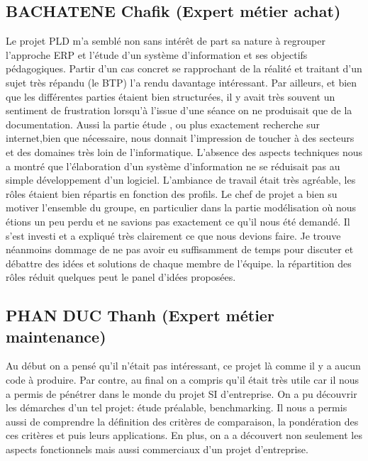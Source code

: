        \subsection{BACHATENE Chafik (Expert métier achat)}

Le projet PLD m'a semblé non sans intérêt de part sa nature à regrouper l'approche ERP et l'étude d'un système d'information et ses objectifs pédagogiques.
Partir d'un cas concret se rapprochant de la réalité et traitant d'un sujet très répandu (le BTP) l'a rendu davantage intéressant. Par ailleurs, et bien que
les différentes parties étaient bien structurées, il y avait très souvent un sentiment de frustration lorsqu'à l'issue d'une séance on ne produisait que de la documentation. Aussi la partie étude , ou plus exactement recherche sur internet,bien que nécessaire, nous donnait l'impression de toucher à des secteurs et des domaines très loin de l'informatique. 
L'absence des aspects techniques nous a montré que l'élaboration d'un système d'information ne se réduisait pas au simple développement d'un logiciel. 
L'ambiance de travail était très agréable, les rôles étaient bien répartis en fonction des profils. Le chef de projet a bien su motiver l'ensemble du groupe, en particulier dans la partie modélisation où nous étions un peu perdu et ne savions pas exactement ce qu'il nous été demandé. Il s'est investi et a expliqué très clairement ce que nous devions faire.
Je trouve néanmoins dommage de ne pas avoir eu suffisamment de temps pour discuter et débattre des idées et solutions de chaque membre de l'équipe. la répartition des rôles réduit quelques peut le panel d'idées proposées. 

       \subsection{PHAN DUC Thanh (Expert métier maintenance)}

Au début on a pensé qu'il n'était pas intéressant, ce projet là comme il y a aucun code à produire. Par  contre, au final on a compris qu'il était très utile car il nous a permis de pénétrer dans le monde du projet SI d'entreprise. On a pu découvrir les démarches d'un tel projet: étude préalable, benchmarking. Il nous a permis aussi de comprendre la définition des critères de comparaison, la pondération des ces critères et puis leurs applications.  En plus, on a a découvert non seulement les aspects fonctionnels mais aussi commerciaux d'un projet d'entreprise.\\

